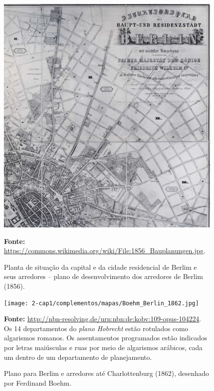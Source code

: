 \begin{a3paisagem}
\begin{figure}[!htp]
\caption{Planta de situação da capital e da cidade residencial de Berlim e seus arredores -- plano de desenvolvimento dos arredores de Berlim (1856).}
\centering
\includegraphics[height=0.9\textheight]{2-cap1/complementos/mapas/1856_Bauplanungen.jpg}{\par \footnotesize \textbf{Fonte:} \url{https://commons.wikimedia.org/wiki/File:1856_Bauplanungen.jpg}.}
\label{fig:bauplannungen1856} 
\end{figure}
\end{a3paisagem}

\begin{a3paisagem}
\begin{figure}[!htp]
\caption{Plano para Berlim e arredores até Charlottenburg (1862), desenhado por Ferdinand Boehm.}
\centering
\texttt{[image: 2-cap1/complementos/mapas/Boehm\_Berlin\_1862.jpg]}{\par \footnotesize \textbf{Fonte:} \url{http://nbn-resolving.de/urn:nbn:de:kobv:109-opus-104224}. Os 14 departamentos do \textit{plano Hobrecht} estão rotulados como algarismos romanos. Os assentamentos programados estão indicados por letras maiúsculas e ruas por meio de algarismos arábicos, cada um dentro de um departamento de planejamento.}
\label{fig:berlin1862} 
\end{figure}
\end{a3paisagem}

